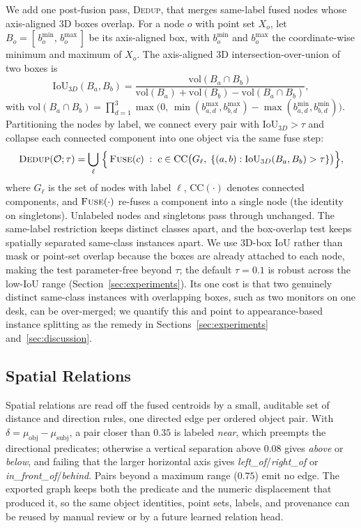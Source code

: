 We add one post-fusion pass, \textsc{Dedup}, that merges same-label fused nodes whose axis-aligned 3D
boxes overlap. For a node $o$ with point set $X_o$, let $B_o=[\,b^{\min}_o,\,b^{\max}_o\,]$ be its
axis-aligned box, with $b^{\min}_o$ and $b^{\max}_o$ the coordinate-wise minimum and maximum of $X_o$.
The axis-aligned 3D intersection-over-union of two boxes is
\begin{equation}
    \mathrm{IoU}_{3D}(B_a,B_b)=
    \frac{\mathrm{vol}\!\left(B_a\cap B_b\right)}
         {\mathrm{vol}(B_a)+\mathrm{vol}(B_b)-\mathrm{vol}\!\left(B_a\cap B_b\right)},
\end{equation}
with $\mathrm{vol}(B_a\cap B_b)=\prod_{d=1}^{3}\max\!\bigl(0,\,
\min(b^{\max}_{a,d},b^{\max}_{b,d})-\max(b^{\min}_{a,d},b^{\min}_{b,d})\bigr)$. Partitioning the nodes by
label, we connect every pair with $\mathrm{IoU}_{3D}>\tau$ and collapse each connected component into one
object via the same fuse step:
\begin{equation}
    \textsc{Dedup}(\mathcal{O};\tau)=
    \bigcup_{\ell}\;\Bigl\{\,\textsc{Fuse}(c)\;:\;
    c\in\mathrm{CC}\bigl(G_\ell,\;\{(a,b):\mathrm{IoU}_{3D}(B_a,B_b)>\tau\}\bigr)\Bigr\},
\end{equation}
where $G_\ell$ is the set of nodes with label $\ell$, $\mathrm{CC}(\cdot)$ denotes connected components,
and $\textsc{Fuse}(\cdot)$ re-fuses a component into a single node (the identity on singletons).
Unlabeled nodes and singletons pass through unchanged. The same-label restriction keeps distinct classes
apart, and the box-overlap test keeps spatially separated same-class instances apart. We use 3D-box IoU
rather than mask or point-set overlap because the boxes are already attached to each node, making the test
parameter-free beyond $\tau$; the default $\tau=0.1$ is robust across the low-IoU range
(Section~\ref{sec:experiments}). Its one cost is that two genuinely distinct same-class instances with
overlapping boxes, such as two monitors on one desk, can be over-merged; we quantify this and point to
appearance-based instance splitting as the remedy in Sections~\ref{sec:experiments}
and~\ref{sec:discussion}.

\subsection{Spatial Relations}
\label{sec:relations}

Spatial relations are read off the fused centroids by a small, auditable set of distance and direction
rules, one directed edge per ordered object pair. With $\delta=\mu_{\text{obj}}-\mu_{\text{subj}}$, a pair
closer than $0.35$ is labeled \emph{near}, which preempts the directional predicates; otherwise a vertical
separation above $0.08$ gives \emph{above} or \emph{below}, and failing that the larger horizontal axis
gives \emph{left\_of}/\emph{right\_of} or \emph{in\_front\_of}/\emph{behind}. Pairs beyond a maximum range
($0.75$) emit no edge. The exported graph keeps both the predicate and the numeric displacement that
produced it, so the same object identities, point sets, labels, and provenance can be reused by manual
review or by a future learned relation head.
